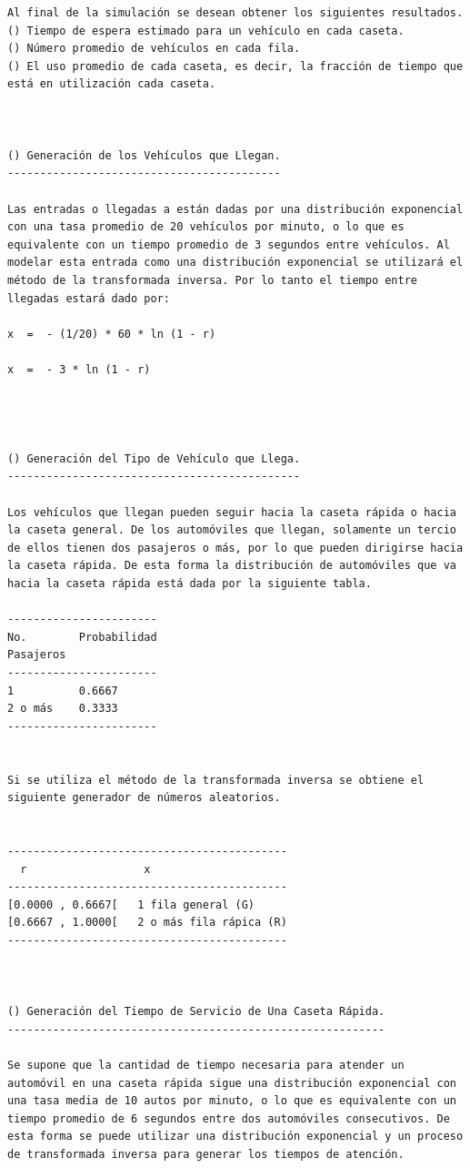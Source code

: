 \begin{verbatim}
Al final de la simulación se desean obtener los siguientes resultados.
() Tiempo de espera estimado para un vehículo en cada caseta.
() Número promedio de vehículos en cada fila.
() El uso promedio de cada caseta, es decir, la fracción de tiempo que está en utilización cada caseta.



() Generación de los Vehículos que Llegan.
------------------------------------------

Las entradas o llegadas a están dadas por una distribución exponencial con una tasa promedio de 20 vehículos por minuto, o lo que es equivalente con un tiempo promedio de 3 segundos entre vehículos. Al modelar esta entrada como una distribución exponencial se utilizará el método de la transformada inversa. Por lo tanto el tiempo entre llegadas estará dado por:

x  =  - (1/20) * 60 * ln (1 - r)

x  =  - 3 * ln (1 - r)




() Generación del Tipo de Vehículo que Llega.
---------------------------------------------

Los vehículos que llegan pueden seguir hacia la caseta rápida o hacia la caseta general. De los automóviles que llegan, solamente un tercio de ellos tienen dos pasajeros o más, por lo que pueden dirigirse hacia la caseta rápida. De esta forma la distribución de automóviles que va hacia la caseta rápida está dada por la siguiente tabla.

-----------------------
No.        Probabilidad
Pasajeros
-----------------------
1          0.6667
2 o más    0.3333
-----------------------


Si se utiliza el método de la transformada inversa se obtiene el siguiente generador de números aleatorios.


-------------------------------------------
  r                  x
-------------------------------------------
[0.0000 , 0.6667[   1 fila general (G)
[0.6667 , 1.0000[   2 o más fila rápica (R)
-------------------------------------------



() Generación del Tiempo de Servicio de Una Caseta Rápida.
----------------------------------------------------------

Se supone que la cantidad de tiempo necesaria para atender un automóvil en una caseta rápida sigue una distribución exponencial con una tasa media de 10 autos por minuto, o lo que es equivalente con un tiempo promedio de 6 segundos entre dos automóviles consecutivos. De esta forma se puede utilizar una distribución exponencial y un proceso de transformada inversa para generar los tiempos de atención.


\end{verbatim}
